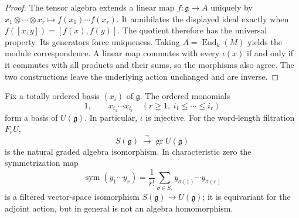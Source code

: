 \begin{proof}
The tensor algebra extends a linear map \(f:\mathfrak g\to A\)
uniquely by
\(x_1\otimes\cdots\otimes x_r\mapsto f(x_1)\cdots f(x_r)\).
It annihilates the displayed ideal exactly when
\(f([x,y])=[f(x),f(y)]\). The quotient therefore has the universal
property. Its generators force uniqueness. Taking
\(A=\operatorname{End}_k(M)\) yields the module correspondence.
A linear map commutes with every \(\iota(x)\) if and only if it
commutes with all products and their sums, so the morphisms also
agree. The two constructions leave the underlying action unchanged
and are inverse.
\end{proof}

\begin{theorem}\label{res:A05}
Fix a totally ordered basis \((x_i)\) of \(\mathfrak g\). The ordered
monomials
\[
 1,\qquad x_{i_1}\cdots x_{i_r}\quad
 (r\geq1,\ i_1\leq\cdots\leq i_r)
\]
form a basis of \(U(\mathfrak g)\). In particular, \(\iota\) is
injective. For the word-length filtration \(F_rU\),
\[
 S(\mathfrak g)\ \xrightarrow{\ \sim\ }\operatorname{gr}U(\mathfrak g)
\]
is the natural graded algebra isomorphism. In characteristic zero
the symmetrization map
\[
 \operatorname{sym}(y_1\cdots y_r)
 =\frac1{r!}\sum_{\sigma\in S_r}y_{\sigma(1)}\cdots y_{\sigma(r)}
 \tag{1.2}\label{eq:symmetrization}
\]
is a filtered vector-space isomorphism \(S(\mathfrak g)\to U(\mathfrak g)\);
it is equivariant for the adjoint action, but in general is not an
algebra homomorphism.
\end{theorem}

